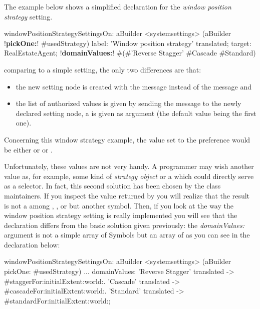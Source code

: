 \documentclass[a4paper,10pt,twoside]{book}
\begin{document}
The example below shows a simplified declaration for the \textit{window position strategy} setting. 
\begin{code}{}
windowPositionStrategySettingsOn: aBuilder
	<systemsettings>
	(aBuilder !\textbf{pickOne:}! #usedStrategy) 
		label: 'Window position strategy' translated;
		target: RealEstateAgent;
		!\textbf{domainValues:}! #(#'Reverse Stagger' #Cascade #Standard)
\end{code}
comparing to a simple setting, the only two differences are that:
\begin{itemize}
\item 
	the new setting node is created with the  message instead of the  message and
\item the list of authorized values is given by sending the  message to the newly declared setting node, a  is given as argument (the default value being the first one).
\end{itemize}

Concerning this window strategy example, the value set to the preference would be either  or  or . 

Unfortunately, these values are not very handy. A programmer may wish another value as, for example, some kind of \textit{strategy object} or a  which could directly serve as a selector. In fact, this second solution has been chosen by the  class maintainers.
If you inspect the value returned by  you will realize that the result is not a  among , , or  but another symbol. Then, if you look at the way the window position strategy setting is really implemented you will see that the declaration differs from the basic solution given previously: the \textit{domainValues:} argument is not a simple array of {Symbol}s but an array of  as you can see in the declaration below:

\begin{code}{}
windowPositionStrategySettingsOn: aBuilder
	<systemsettings> 
	(aBuilder pickOne: #usedStrategy)
	...
	domainValues: {'Reverse Stagger' translated -> #staggerFor:initialExtent:world:. 'Cascade' translated -> #cascadeFor:initialExtent:world:. 'Standard' translated -> #standardFor:initialExtent:world:};
\end{code}
\end{document}
